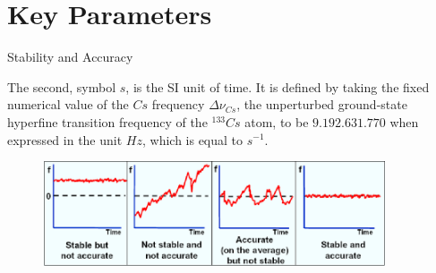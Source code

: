 \section{Key Parameters}

%

\begin{frame}{Stability and Accuracy}

    The second, symbol $s$, is the SI unit of time.
    It is defined by taking the fixed numerical value of the $Cs$ frequency $\Delta \nu_{Cs}$, the unperturbed ground-state hyperfine transition frequency of the $^{133}Cs$ atom, to be $9.192.631.770$ when expressed in the unit $Hz$, which is equal to $s^{-1}$.

    \begin{figure}
        \centering
        \includegraphics[width=0.9\textwidth]{img/stability-accuracy.png}
    \end{figure}

\end{frame}



